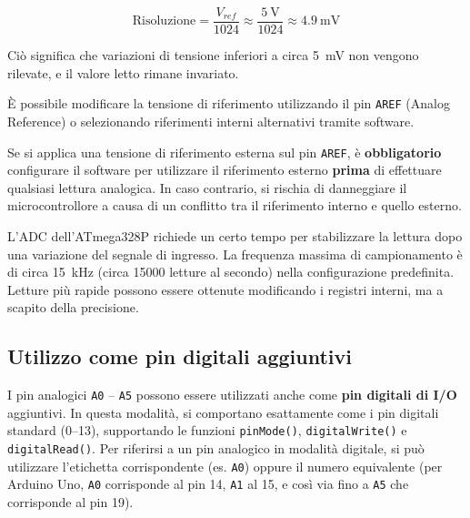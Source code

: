 \begin{equation}
    \text{Risoluzione} = \frac{V_{ref}}{1024} \approx \frac{\SI{5}{\volt}}{1024} \approx \SI{4.9}{\milli\volt}
\end{equation}

Ciò significa che variazioni di tensione inferiori a circa \SI{5}{\milli\volt} non vengono rilevate, e il valore letto rimane invariato.

È possibile modificare la tensione di riferimento utilizzando il pin \texttt{AREF} (Analog Reference) o selezionando riferimenti interni alternativi tramite software.

\begin{tcolorbox}[colback=red!4, colframe=red!60, title=\textbf{Attenzione – Utilizzo di AREF}]
    Se si applica una tensione di riferimento esterna sul pin \texttt{AREF}, è \textbf{obbligatorio} configurare il software per utilizzare il riferimento esterno \textbf{prima} di effettuare qualsiasi lettura analogica. In caso contrario, si rischia di danneggiare il microcontrollore a causa di un conflitto tra il riferimento interno e quello esterno.
\end{tcolorbox}



\begin{tcolorbox}[colback=orange!4, colframe=orange!70, title=\textbf{Tempo di acquisizione e frequenza di campionamento}]
    L'ADC dell'ATmega328P richiede un certo tempo per stabilizzare la lettura dopo una variazione del segnale di ingresso. La frequenza massima di campionamento è di circa \SI{15}{\kilo\hertz} (circa \num{15000} letture al secondo) nella configurazione predefinita. Letture più rapide possono essere ottenute modificando i registri interni, ma a scapito della precisione.
\end{tcolorbox}

\subsection*{Utilizzo come pin digitali aggiuntivi}

I pin analogici \texttt{A0} – \texttt{A5} possono essere utilizzati anche come \textbf{pin digitali di I/O} aggiuntivi. In questa modalità, si comportano esattamente come i pin digitali standard (0–13), supportando le funzioni \texttt{pinMode()}, \texttt{digitalWrite()} e \texttt{digitalRead()}. Per riferirsi a un pin analogico in modalità digitale, si può utilizzare l'etichetta corrispondente (es. \texttt{A0}) oppure il numero equivalente (per Arduino Uno, \texttt{A0} corrisponde al pin 14, \texttt{A1} al 15, e così via fino a \texttt{A5} che corrisponde al pin 19).

